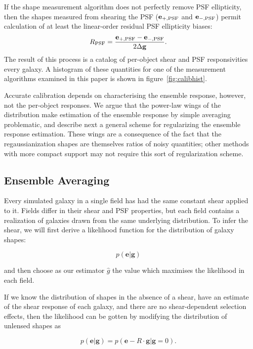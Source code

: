\documentclass[iop]{emulateapj}
\begin{document}
If the shape measurement algorithm does not perfectly remove PSF
ellipticity, then the shapes measured from shearing the PSF
($\mathbf{e}_{+,\rm PSF}$ and $\mathbf{e}_{-,\rm PSF}$) permit
calculation of at least the linear-order residual PSF ellipticity
biases:
\begin{align}
R_{\rm PSF} = \frac{\mathbf{e}_{+,\rm PSF} - \mathbf{e}_{-,\rm PSF}}{2\Delta\mathbf{g}}.
\end{align}
The result of this process is a catalog of per-object shear and PSF
responsivities every galaxy.  A histogram of these quantities for one
of the measurement algorithms examined in this paper is shown in
figure~\ref{fig:calibhist}. 

Accurate calibration depends on characterising the ensemble response,
however, not the per-object responses. We argue that the power-law
wings of the distribution make estimation of the ensemble response by
simple averaging problematic, and describe next a general scheme for
regularizing the ensemble response estimation. These wings are
a consequence of the fact that the regaussianization shapes are
themselves ratios of noisy quantities; other methods with more compact
support may not require this sort of regularization scheme.

\subsection{Ensemble Averaging}
Every simulated galaxy in a single field has had the same constant
shear applied to it. Fields differ in their shear and PSF properties,
but each field contains a realization of galaxies drawn from the same
underlying distribution. To infer the shear, we will first derive a
likelihood function for the distribution of galaxy shapes:

\begin{equation}
p(\mathbf{e}|\mathbf{g})
\end{equation}

and then choose as our estimator $\hat{g}$ the value which
maximises the likelihood in each field.

If we know the distribution of shapes in the absence of a shear, have
an estimate of the shear response of each galaxy, and there are no
shear-dependent selection effects, then the likelihood can be gotten
by modifying the distribution of unlensed shapes as

\begin{equation}
p(\mathbf{e}|\mathbf{g}) = p(\mathbf{e}-R\cdot\mathbf{g} | \mathbf{g}=0).
\end{equation}
\end{document}
